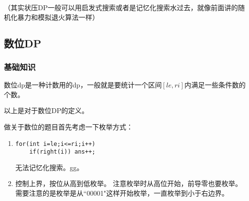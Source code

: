 	（其实状压DP一般可以用启发式搜索或者是记忆化搜索水过去，就像前面讲的随机化暴力和模拟退火算法一样）
	\note
	\subsection{数位DP}
	\subsubsection{基础知识}
	\begin{definition}[数位DP]数位dp是一种计数用的dp，一般就是要统计一个区间$[le,ri]$内满足一些条件数的个数。
	\end{definition}
	以上是对于数位DP的定义。

	做关于数位的题目首先考虑一下枚举方式：
	\begin{enumerate}
		\item{\begin{verbatim}
for(int i=le;i<=ri;i++)  
    if(right(i)) ans++;
\end{verbatim}
		      无法记忆化搜索。gg。}
		\item{控制上界，按位从高到低枚举。
		      注意枚举时从高位开始，前导零也要枚举。
		      需要注意的是枚举是从``00001"这样开始枚举，一直枚举到小于右边界。}
	\end{enumerate}
	

